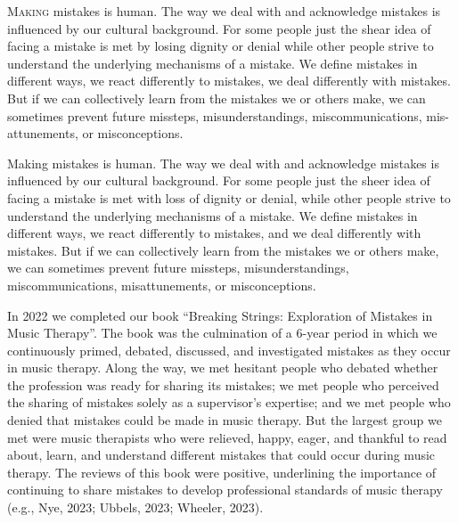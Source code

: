 \documentclass[authordate, empirical, issue]{jote-new-article}
\author[1]{\mbox{Laurien Hakvoort}}
\affil[1]{ArtEZ University of the Arts}
\author[2]{\mbox{Avi Gilboa}}
\affil[2]{Bar Ilan University}
\begin{document}
\begin{frontmatter}
  \maketitle
  \begin{abstract}
    \printabstracttext
  \end{abstract}
\end{frontmatter}





\lettrine{M}{aking} mistakes is human. The way we deal with and acknowledge mistakes is influenced by our cultural background. For some people just the shear idea of facing a mistake is met by losing dignity or denial while other people strive to understand the underlying mechanisms of a mistake. We define mistakes in different ways, we react differently to mistakes, we deal differently with mistakes. But if we can collectively learn from the mistakes we or others make, we can sometimes prevent future missteps, misunderstandings, miscommunications, mis-attunements, or misconceptions.


Making mistakes is human. The way we deal with and acknowledge mistakes is influenced by our cultural background. For some people just the sheer idea of facing a mistake is met with loss of dignity or denial, while other people strive to understand the underlying mechanisms of a mistake. We define mistakes in different ways, we react differently to mistakes, and we deal differently with mistakes. But if we can collectively learn from the mistakes we or others make, we can sometimes prevent future missteps, misunderstandings, miscommunications, misattunements, or misconceptions.



In 2022 we completed our book “Breaking Strings: Exploration of Mistakes in Music Therapy”. The book was the culmination of a 6-year period in which we continuously primed, debated, discussed, and investigated mistakes as they occur in music therapy. Along the way, we met hesitant people who debated whether the profession was ready for sharing its mistakes; we met people who perceived the sharing of mistakes solely as a supervisor's expertise; and we met people who denied that mistakes could be made in music therapy. But the largest group we met were music therapists who were relieved, happy, eager, and thankful to read about, learn, and understand different mistakes that could occur during music therapy. The reviews of this book were positive, underlining the importance of continuing to share mistakes to develop professional standards of music therapy (e.g., Nye, 2023; Ubbels, 2023; Wheeler, 2023).
\end{document}
